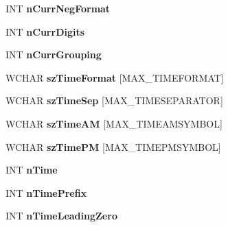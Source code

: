 \begin{DoxyCompactItemize}
I\+NT {\bfseries n\+Curr\+Neg\+Format}
\item 
\mbox{\label{struct___g_l_o_b_a_l_d_a_t_a_a2288239fac4cfe6e36fba92335b3f8b9}} 
I\+NT {\bfseries n\+Curr\+Digits}
\item 
\mbox{\label{struct___g_l_o_b_a_l_d_a_t_a_a211dcf2f0c606ca87f613ea0d332cd38}} 
I\+NT {\bfseries n\+Curr\+Grouping}
\item 
\mbox{\label{struct___g_l_o_b_a_l_d_a_t_a_a5369bd1e24c013672409f5e75220f99a}} 
W\+C\+H\+AR {\bfseries sz\+Time\+Format} \mbox{[}M\+A\+X\+\_\+\+T\+I\+M\+E\+F\+O\+R\+M\+AT\mbox{]}
\item 
\mbox{\label{struct___g_l_o_b_a_l_d_a_t_a_ae1555b57cebeb7148bf5f2da5876e64c}} 
W\+C\+H\+AR {\bfseries sz\+Time\+Sep} \mbox{[}M\+A\+X\+\_\+\+T\+I\+M\+E\+S\+E\+P\+A\+R\+A\+T\+OR\mbox{]}
\item 
\mbox{\label{struct___g_l_o_b_a_l_d_a_t_a_a73d91bab8e144ce9698ea7c3fe2f2761}} 
W\+C\+H\+AR {\bfseries sz\+Time\+AM} \mbox{[}M\+A\+X\+\_\+\+T\+I\+M\+E\+A\+M\+S\+Y\+M\+B\+OL\mbox{]}
\item 
\mbox{\label{struct___g_l_o_b_a_l_d_a_t_a_a45603d65d154b58af33d15097323f09d}} 
W\+C\+H\+AR {\bfseries sz\+Time\+PM} \mbox{[}M\+A\+X\+\_\+\+T\+I\+M\+E\+P\+M\+S\+Y\+M\+B\+OL\mbox{]}
\item 
\mbox{\label{struct___g_l_o_b_a_l_d_a_t_a_ab4907c02e21f5ef8b49f8717656d11d1}} 
I\+NT {\bfseries n\+Time}
\item 
\mbox{\label{struct___g_l_o_b_a_l_d_a_t_a_aebbba04559da9a99f49aff2f1a4fa19f}} 
I\+NT {\bfseries n\+Time\+Prefix}
\item 
\mbox{\label{struct___g_l_o_b_a_l_d_a_t_a_a3f6a8545178a09381f3d2826b6bef0d1}} 
I\+NT {\bfseries n\+Time\+Leading\+Zero}
\item 
\mbox{\label{struct___g_l_o_b_a_l_d_a_t_a_a5486474775d424ba39d7b94030d077e9}} 

\end{DoxyCompactItemize}
